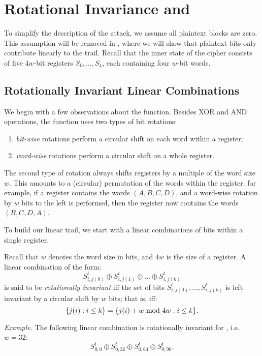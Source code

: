 
\section{Rotational Invariance and \texorpdfstring{\MiniMORUS}{MiniMORUS}}
\label{sec/introminimorus}

To simplify the description of the attack, we assume all plaintext blocks are zero. This assumption will be removed in , where we will show that plaintext bits only contribute linearly to the trail. Recall that the inner state of the cipher consists of five $4w$-bit registers $S_0,\dots,S_4$, each containing four $w$-bit words.

\subsection{Rotationally Invariant Linear Combinations}

We begin with a few observations about the \StateUpdate{} function. Besides XOR and AND operations, the \StateUpdate{} function uses two types of bit rotations:
\begin{enumerate}
\item \emph{bit-wise} rotations perform a circular shift on each word within a register;
\item \emph{word-wise} rotations perform a circular shift on a whole register.
\end{enumerate}
The second type of rotation always shifts registers by a multiple of the word size $w$. This amounts to a (circular) permutation of the words within the register: for example, if a register contains the words $(A, B, C, D)$, and a word-wise rotation by $w$ bits to the left is performed, then the register now contains the words $(B, C, D, A)$.

To build our linear trail, we start with a linear combinations of bits within a single register.
\begin{definition}
Recall that $w$ denotes the word size in bits, and $4w$ is the size of a register. A linear combination of the form:
\[
S^t_{i,j(0)} \oplus S^t_{i,j(1)} \oplus \dots \oplus S^t_{i,j(k)}
\]
is said to be \emph{rotationally invariant} iff the set of bits $S^t_{i,j(0)}, \dots, S^t_{i,j(k)}$ is left invariant by a circular shift by $w$ bits; that is, iff:
\[
\{j(i) : i\leq k\} = \{j(i) + w \text{\rm{} mod } 4w : i\leq k\}.
\]
\end{definition}
\emph{Example.} The following linear combination is rotationally invariant for \MORUS[640], i.e. $w = 32$:
\begin{equation}
S^t_{0,0} \oplus S^t_{0,32} \oplus S^t_{0,64} \oplus S^t_{0,96}.
\label{eq:symmetric}
\end{equation}

